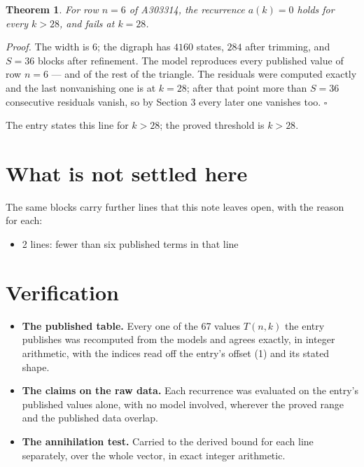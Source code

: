 \documentclass[11pt]{article}
\newtheorem{theorem}{Theorem}
\theoremstyle{definition}
\begin{document}
\begin{theorem} For row $n = 6$ of A303314, the recurrence $a(k) = 0$ holds for every $k > 28$, and fails at $k = 28$.\end{theorem}

{\itshape Proof.} The width is $6$; the digraph has $4160$ states, $284$ after trimming, and $S = 36$ blocks after refinement. The model reproduces every published value of row $n = 6$ --- and of the rest of the triangle. The residuals were computed exactly and the last nonvanishing one is at $k = 28$; after that point more than $S = 36$ consecutive residuals vanish, so by Section 3 every later one vanishes too. $\square$

The entry states this line for $k > 28$; the proved threshold is $k > 28$.

\section{What is not settled here}

The same blocks carry further lines that this note leaves open, with the reason for each:

\begin{itemize}

\item 2 lines: fewer than six published terms in that line

\end{itemize}

\section{Verification}

\begin{itemize}

\item {\bfseries The published table.} Every one of the 67 values $T(n,k)$ the entry publishes was recomputed from the models and agrees exactly, in integer arithmetic, with the indices read off the entry's offset (1) and its stated shape.

\item {\bfseries The claims on the raw data.} Each recurrence was evaluated on the entry's published values alone, with no model involved, wherever the proved range and the published data overlap.

\item {\bfseries The annihilation test.} Carried to the derived bound for each line separately, over the whole vector, in exact integer arithmetic.

\end{itemize}
\end{document}
